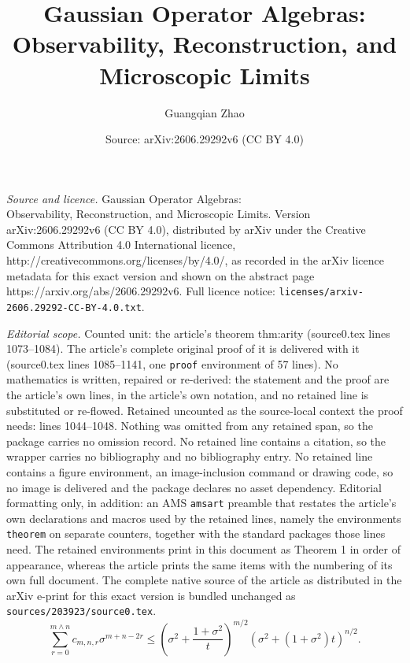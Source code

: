 \documentclass[10pt,a4paper]{amsart}
\title{Gaussian Operator Algebras:\\ Observability, Reconstruction, and Microscopic Limits}
\author{Guangqian Zhao}
\date{Source: arXiv:2606.29292v6 (CC BY 4.0)}
\begin{document}
\maketitle

\noindent\emph{Source and licence.} Gaussian Operator Algebras:\\ Observability, Reconstruction, and Microscopic Limits. Version arXiv:2606.29292v6 (CC BY 4.0), distributed by arXiv under the Creative Commons Attribution 4.0 International licence, http://creativecommons.org/licenses/by/4.0/, as recorded in the arXiv licence metadata for this exact version and shown on the abstract page https://arxiv.org/abs/2606.29292v6. Full licence notice: \texttt{licenses/arxiv-2606.29292-CC-BY-4.0.txt}.\par\smallskip

\noindent\textit{Editorial scope.} Counted unit: the article's theorem thm:arity (source0.tex lines 1073--1084). The article's complete original proof of it is delivered with it (source0.tex lines 1085--1141, one \texttt{proof} environment of 57 lines). No mathematics is written, repaired or re-derived: the statement and the proof are the article's own lines, in the article's own notation, and no retained line is substituted or re-flowed.  Retained uncounted as the source-local context the proof needs: lines 1044--1048.  Nothing was omitted from any retained span, so the package carries no omission record.  No retained line contains a citation, so the wrapper carries no bibliography and no bibliography entry.  No retained line contains a figure environment, an image-inclusion command or drawing code, so no image is delivered and the package declares no asset dependency.  Editorial formatting only, in addition: an AMS \texttt{amsart} preamble that restates the article's own declarations and macros used by the retained lines, namely the environments \texttt{theorem} on separate counters, together with the standard packages those lines need.  The retained environments print in this document as Theorem 1 in order of appearance, whereas the article prints the same items with the numbering of its own full document.  The complete native source of the article as distributed in the arXiv e-print for this exact version is bundled unchanged as \texttt{sources/203923/source0.tex}.
\begin{equation}\label{eq:positivekernel}
 \sum_{r=0}^{m\wedge n}c_{m,n,r}\sigma^{m+n-2r}
 \le\left(\sigma^2+\frac{1+\sigma^2}{t}\right)^{m/2}
     \left(\sigma^2+(1+\sigma^2)t\right)^{n/2}.
\end{equation}
\end{document}
